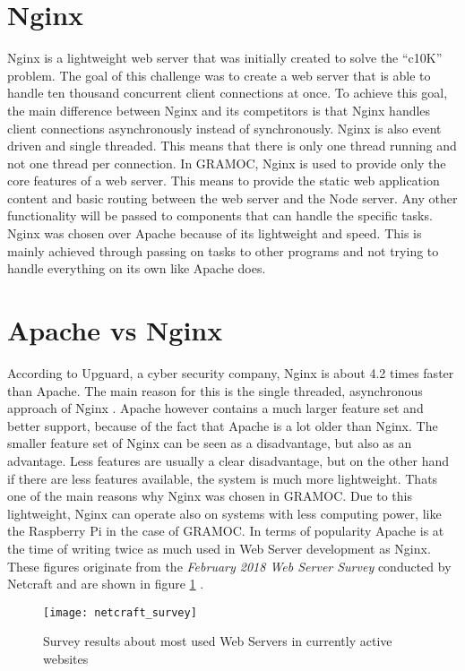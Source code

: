 \section{Nginx}
Nginx is a lightweight web server that was initially created to solve the ``c10K'' problem. The goal of this challenge was to create a web server that is able to handle ten thousand concurrent client connections at once. To achieve this goal, the main difference between Nginx and its competitors is that Nginx handles client connections asynchronously instead of synchronously. Nginx is also event driven and single threaded. This means that there is only one thread running and not one thread per connection. In GRAMOC, Nginx is used to provide only the core features of a web server. This means to provide the static web application content and basic routing between the web server and the Node server. Any other functionality will be passed to components that can handle the specific tasks. Nginx was chosen over Apache because of its lightweight and speed. This is mainly achieved through passing on tasks to other programs and not trying to handle everything on its own like Apache does.

\section{Apache vs Nginx}
According to Upguard, a cyber security company, Nginx is about 4.2 times faster than Apache. The main reason for this is the single threaded, asynchronous approach of Nginx \autocite{UpguardAvN}.
Apache however contains a much larger feature set and better support, because of the fact that Apache is a lot older than Nginx. The smaller feature set of Nginx can be seen as a disadvantage, but also as an advantage. Less features are usually a clear disadvantage, but on the other hand if there are less features available, the system is much more lightweight. Thats one of the main reasons why Nginx was chosen in GRAMOC. Due to this lightweight, Nginx can operate also on systems with less computing power, like the Raspberry Pi in the case of GRAMOC.
In terms of popularity Apache is at the time of writing twice as much used in Web Server development as Nginx. These figures originate from the \textit{February 2018 Web Server Survey} conducted by Netcraft and are shown in figure \ref{fig:netcraft_survey} \autocite{netcraft_survey}.

\begin{figure}[H]
    \centering
    \texttt{[image: netcraft\_survey]}
    \caption{Survey results about most used Web Servers in currently active websites}
    \label{fig:netcraft_survey}
\end{figure}

